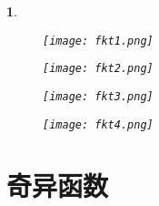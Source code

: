 \documentclass[UTF8]{report}
\theoremstyle{MyLineTheoremStyle} %
\theoremstyle{MyBlockTheoremStyle} %
\theoremstyle{MySubsubsectionStyle} %
\newtheorem{definition}{}
\begin{document}
\begin{definition}

\begin{figure}[ht]
    \centering
    \texttt{[image: fkt1.png]}
    \end{figure}

\begin{figure}[ht]
    \centering
    \texttt{[image: fkt2.png]}
    \end{figure}

\begin{figure}[ht]
    \centering
    \texttt{[image: fkt3.png]}
    \end{figure}

\begin{figure}[ht]
    \centering
    \texttt{[image: fkt4.png]}
    \end{figure}

\end{definition}

\cleardoublepage
\section{奇异函数}
\end{document}
